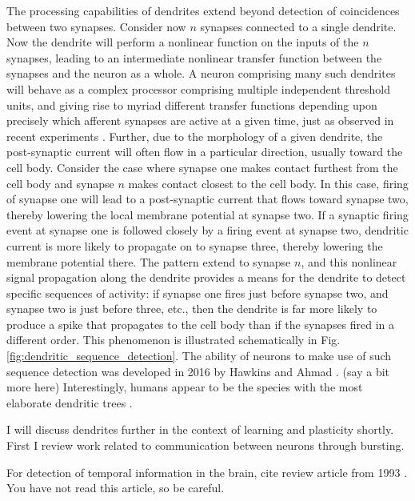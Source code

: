 \documentclass[twocolumn]{article}
\begin{document}
The processing capabilities of dendrites extend beyond detection of coincidences between two synapses. Consider now $n$ synapses connected to a single dendrite. Now the dendrite will perform a nonlinear function on the inputs of the $n$ synapses, leading to an intermediate nonlinear transfer function between the synapses and the neuron as a whole. A neuron comprising many such dendrites will behave as a complex processor comprising multiple independent threshold units, and giving rise to myriad different transfer functions depending upon precisely which afferent synapses are active at a given time, just as observed in recent experiments \cite{sava2017}. Further, due to the morphology of a given dendrite, the post-synaptic current will often flow in a particular direction, usually toward the cell body. Consider the case where synapse one makes contact furthest from the cell body and synapse $n$ makes contact closest to the cell body. In this case, firing of synapse one will lead to a post-synaptic current that flows toward synapse two, thereby lowering the local membrane potential at synapse two. If a synaptic firing event at synapse one is followed closely by a firing event at synapse two, dendritic current is more likely to propagate on to synapse three, thereby lowering the membrane potential there. The pattern extend to synapse $n$, and this nonlinear signal propagation along the dendrite provides a means for the dendrite to detect specific sequences of activity: if synapse one fires just before synapse two, and synapse two is just before three, etc., then the dendrite is far more likely to produce a spike that propagates to the cell body than if the synapses fired in a different order. This phenomenon is illustrated schematically in Fig.\,\ref{fig:dendritic_sequence_detection}. The ability of neurons to make use of such sequence detection was developed in 2016 by Hawkins and Ahmad \cite{haah2015}. (say a bit more here) Interestingly, humans appear to be the species with the most elaborate dendritic trees \cite{el2003}.

I will discuss dendrites further in the context of learning and plasticity shortly. First I review work related to communication between neurons through bursting.

\vspace{3em}
For detection of temporal information in the brain, cite review article from 1993 \cite{ca1993}. You have not read this article, so be careful.
\end{document}
